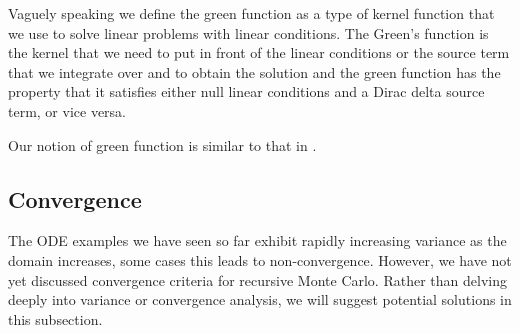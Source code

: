 \documentclass[a4paper,12pt]{article}
\begin{document}
\begin{definition}
    Vaguely speaking we define the green function as a type of kernel function that we use
    to solve linear problems with linear conditions. The Green's function is the kernel that
    we need to put in front of  the linear conditions or the source term that we integrate
    over and to obtain the solution  and the green function has the property that it satisfies
    either null linear conditions and a Dirac delta source term, or vice versa.
\end{definition}

\begin{related}
    Our notion of green function is similar to that in \cite{hwang_simulationtabulation_2001}.
\end{related}


\subsection{Convergence}

The ODE examples we have seen so far exhibit rapidly increasing variance as the domain increases,
some cases this leads to non-convergence. However, we have not yet discussed convergence
criteria for recursive Monte Carlo. Rather than delving deeply into variance
or convergence analysis, we will suggest potential solutions in this subsection.
\end{document}
